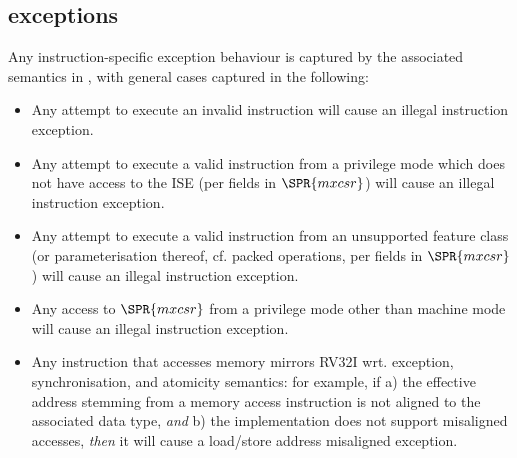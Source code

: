 \subsection{\XCID exceptions}
\label{sec:spec:exceptions}


Any instruction-specific exception behaviour is captured by the associated
semantics in , with general cases captured in
the following:

\begin{itemize}
\item Any attempt to execute an
      invalid \XCID instruction
      will cause an 
      illegal instruction exception.
\item Any attempt to execute a
        valid \XCID instruction
      from a privilege mode which does not have access to the ISE
      (per fields in $\SPR{mxcsr}$)
      will cause an
      illegal instruction exception.
\item Any attempt to execute a
        valid \XCID instruction
      from an unsupported feature class (or parameterisation thereof, cf. packed operations, per fields in $\SPR{mxcsr}$)
      will cause an 
      illegal instruction exception.
\item Any access to
      $\SPR{mxcsr}$
      from a privilege mode other than machine mode
      will cause an 
      illegal instruction exception.
\item Any instruction that accesses memory mirrors RV32I wrt. exception,
      synchronisation, and atomicity semantics: for example, if
      a) the effective address stemming from a memory access instruction
         is not aligned to the associated data type, 
         {\em  and}
      b) the implementation does not support misaligned accesses,
         {\em then}
         it will cause a 
         load/store address misaligned exception.
\end{itemize}

